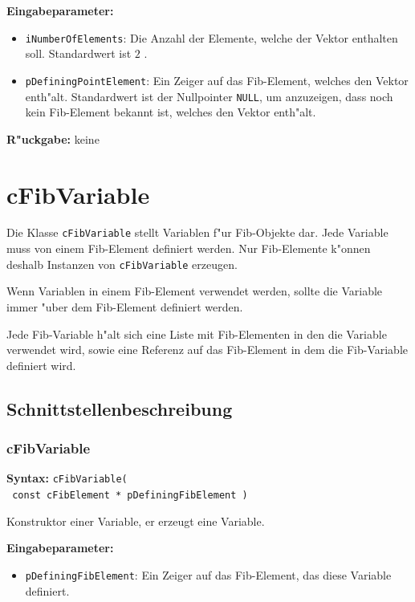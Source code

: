 \bigskip\noindent
\textbf{Eingabeparameter:}
\begin{itemize}
 \item \verb|iNumberOfElements|: Die Anzahl der Elemente, welche der Vektor enthalten soll. Standardwert ist $2$ .
 \item \verb|pDefiningPointElement|: Ein Zeiger auf das Fib-Element, welches den Vektor enth"alt. Standardwert ist der Nullpointer \verb|NULL|, um anzuzeigen, dass noch kein Fib-Element bekannt ist, welches den Vektor enth"alt.
\end{itemize}

\bigskip\noindent
\textbf{R"uckgabe:} keine



\section{cFibVariable}

Die Klasse \verb|cFibVariable| stellt Variablen f"ur Fib-Objekte dar. Jede Variable muss von einem Fib-Element definiert werden. Nur Fib-Elemente k"onnen deshalb Instanzen von \verb|cFibVariable| erzeugen.

Wenn Variablen in einem Fib-Element verwendet werden, sollte die Variable immer "uber dem Fib-Element definiert werden.

Jede Fib-Variable h"alt sich eine Liste mit Fib-Elementen in den die Variable verwendet wird, sowie eine Referenz auf das Fib-Element in dem die Fib-Variable definiert wird.


\subsection{Schnittstellenbeschreibung}


\subsubsection{cFibVariable}

\textbf{Syntax:} \verb|cFibVariable(| \\\verb| const cFibElement * pDefiningFibElement )|

\bigskip\noindent
Konstruktor einer Variable, er erzeugt eine Variable.

\bigskip\noindent
\textbf{Eingabeparameter:}
\begin{itemize}
 \item \verb|pDefiningFibElement|: Ein Zeiger auf das Fib-Element, das diese Variable definiert.
\end{itemize}


